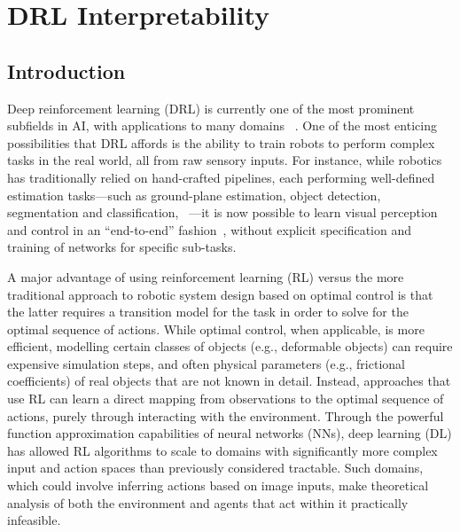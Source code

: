 \chapter{DRL Interpretability}
\label{ch:drl_interp}
\section{Introduction}
Deep reinforcement learning (DRL) is currently one of the most prominent subfields in AI, with applications to many domains ~\cite{arulkumaran2017deep}. One of the most enticing possibilities that DRL affords is the ability to train robots to perform complex tasks in the real world, all from raw sensory inputs. For instance, while robotics has traditionally relied on hand-crafted pipelines, each performing well-defined estimation tasks---such as ground-plane estimation, object detection, segmentation and classification, ~\cite{kragic2009vision,martinez2014taxonomy}---it is now possible to
learn visual perception and control in an ``end-to-end'' fashion~\cite{gu2017deep,levine2016end,zhu2017target}, without explicit specification and training of networks for specific sub-tasks.

A major advantage of using reinforcement learning (RL) versus the more traditional approach to robotic system design based on optimal control is that the latter requires a transition model for the task in order to solve for the optimal sequence of actions. While optimal control, when applicable, is more efficient, modelling certain classes of objects (e.g., deformable objects) can require expensive simulation steps, and often physical parameters (e.g., frictional coefficients) of real objects that are not known in detail. Instead, approaches that use RL can learn a direct mapping from observations to the optimal sequence of actions, purely through interacting with the environment. Through the powerful function approximation capabilities of neural networks (NNs), deep learning (DL) has allowed RL algorithms to scale to domains with significantly more complex input and action spaces than previously considered tractable. Such domains, which could involve inferring actions based on image inputs, make theoretical analysis of both the environment and agents that act within it practically infeasible.

